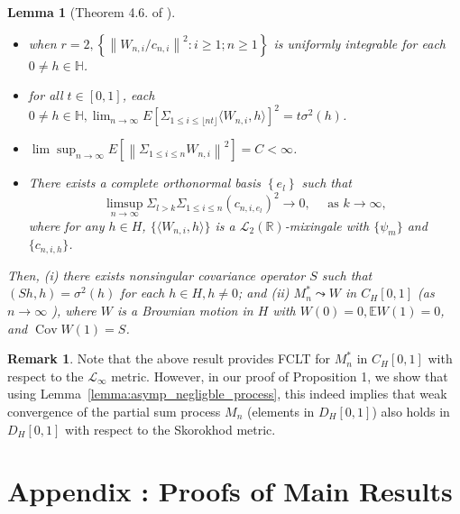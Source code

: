 \documentclass[11pt]{article}
\newcommand{\cL}{\mathcal{L}}
\theoremstyle{plain}
\newtheorem{lemma}[theorem]{Lemma}
\theoremstyle{definition}
\newtheorem{remark}{Remark}
\theoremstyle{remark}
\begin{document}
\begin{appendix}
\begin{lemma}[Theorem 4.6. of \cite{chen1998central}]
\begin{itemize}
\begin{itemize}
       \end{itemize}
       \item [(b)] when $r=2,\left\{\left\|W_{n, i} / c_{n, i}\right\|^2: i \geq 1 ; n \geq 1\right\}$ is uniformly integrable for each $0 \neq h \in \mathbb{H}$.
       \item [(c)] for all $t \in[0,1]$, each $0 \neq h \in \mathbb{H}, \lim _{n \rightarrow \infty} E\left[\Sigma_{1 \leq i \leq \lfloor nt \rfloor}\langle W_{n, i}, h\rangle\right]^2=t \sigma^2(h)$.
       \item [(d)] $\lim \sup _{n \rightarrow \infty} E\left[\left\|\Sigma_{1 \leq i \leq n} W_{n, i}\right\|^2\right]=C<\infty$.
       \item [(e)]There exists a complete orthonormal basis $\left\{e_l\right\}$ such that
$$
\limsup _{n \rightarrow \infty} \Sigma_{l>k} \Sigma_{1 \leq i \leq n}\left(c_{n, i, e_l}\right)^2 \rightarrow 0, \quad \text { as } k \rightarrow \infty,
$$
where for any $h \in H$, $\{\langle W_{n,i},h \rangle\}$ is a $\cL_2(\mathbb{R})$-mixingale with $\{\psi_m\}$ and $\{c_{n,i,h}\}$.
   \end{itemize}
Then, (i) there exists nonsingular covariance operator $S$ such that $(S h, h)=\sigma^2(h)$ for each $h \in H, h \neq 0$; and (ii) $M^*_n \leadsto W$ in $C_{H}[0,1]$ (as $n \rightarrow \infty$ ), where $W$ is a Brownian motion in $H$ with $W(0)=0, \mathbb{E} W(1)=0$, and $\operatorname{Cov} W(1)=S$.
\end{lemma}
\begin{remark}
    Note that the above result provides FCLT for $M_n^*$ in $C_H[0,1]$ with respect to the $\cL_{\infty}$ metric. However, in our proof of Proposition 1, we show that using Lemma~\ref{lemma:asymp_negligble_process}, this indeed implies that weak convergence of the partial sum process $M_n$ (elements in $D_H[0,1]$) also holds in $D_H[0,1]$ with respect to the Skorokhod metric. 
\end{remark}
\section*{Appendix \thesection: Proofs of Main Results}\label{appnd}

\end{appendix}
\end{document}
